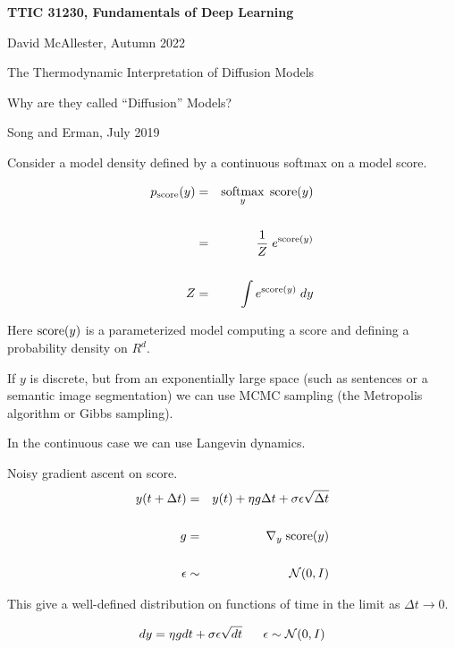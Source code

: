 





{\Huge

  \centerline{\bf TTIC 31230, Fundamentals of Deep Learning}
  \bigskip
  \centerline{David McAllester, Autumn 2022}
  \vfill
  \vfil
  \centerline{The Thermodynamic Interpretation of Diffusion Models}
  \vfill
  \centerline{Why are they called ``Diffusion'' Models?}
  \vfill
  \vfill

 
  {Song and Erman, July 2019}

Consider a model density defined by a continuous softmax on a model score.

\vfill
\begin{eqnarray*}
  p_{\mathrm{score}}(y) & = & \operatorname*{softmax}_y\; \mathrm{score}(y) \\
  \\
  & = & \frac{1}{Z} \;e^{\mathrm{score}(y)} \\
  \\
  Z & = & \int e^{\mathrm{score}(y)}\;dy
\end{eqnarray*}

\vfill
Here $\mathrm{score}(y)$ is a parameterized model computing a score and defining a probability density on $R^d$.


If $y$ is discrete, but from an exponentially large space (such as sentences or a semantic image segmentation) we can use MCMC sampling
(the Metropolis algorithm or Gibbs sampling).

\vfill
In the continuous case we can use Langevin dynamics.


Noisy gradient ascent on score.
\begin{eqnarray*}
  y(t+ \Delta t) & = & y(t) + \eta g \Delta t +  \sigma \epsilon \sqrt{\Delta t} \\
\\
g & = & \nabla_y\;\mathrm{score}(y) \\
\\
\epsilon & \sim & {\cal N}(0,I)
\end{eqnarray*}

\vfill
This give a well-defined distribution on functions of time in the limit as $\Delta t \rightarrow 0$.

{\color{red} $$dy =  \eta g dt + \sigma \epsilon \sqrt{dt}\;\;\;\;\;\; \epsilon \sim {\cal N}(0,I)$$}

}
